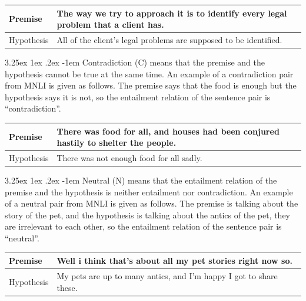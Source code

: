 \documentclass[12pt]{article}
\makeatletter
\renewcommand\subparagraph{\@startsection{subparagraph}{6}{\parindent}%
  {3.25ex \@plus1ex \@minus .2ex}%
  {-1em}%
  {\normalfont\normalsize\bfseries}}
\makeatother
\begin{document}
\begin{CJK*}{UTF8}{bkai}
\begin{spacing}{1.77}
\begin{table}[H]
  \centering
  \setlength{\extrarowheight}{-3pt}
  \begin{tabular}{|L{2cm}|L{13cm}|}
    \hline
    Premise & The way we try to approach it is to identify every legal problem that a client has. \\ \hline
    Hypothesis & All of the client's legal problems are supposed to be identified. \\ \hline
  \end{tabular}
\end{table}

\subparagraph{Contradiction (C)} means that the premise and the hypothesis cannot be true at the same time. An example of a contradiction pair from MNLI is given as follows. The premise says that the food is enough but the hypothesis says it is not, so the entailment relation of the sentence pair is ``contradiction''.

\begin{table}[H]
  \centering
  \setlength{\extrarowheight}{-3pt}
  \begin{tabular}{|L{2cm}|L{13cm}|}
    \hline
    Premise & There was food for all, and houses had been conjured hastily to shelter the people. \\ \hline
    Hypothesis & There was not enough food for all sadly. \\ \hline
  \end{tabular}
\end{table}

\subparagraph{Neutral (N)} means that the entailment relation of the premise and the hypothesis is neither entailment nor contradiction. An example of a neutral pair from MNLI is given as follows. The premise is talking about the story of the pet, and the hypothesis is talking about the antics of the pet, they are irrelevant to each other, so the entailment relation of the sentence pair is ``neutral''.

\begin{table}[H]
  \centering
  \setlength{\extrarowheight}{-3pt}
  \begin{tabular}{|L{2cm}|L{13cm}|}
    \hline
    Premise & Well i think that's about all my pet stories right now so. \\ \hline
    Hypothesis & My pets are up to many antics, and I'm happy I got to share these. \\ \hline
  \end{tabular}
\end{table}


\end{spacing}
\end{CJK*}
\end{document}
